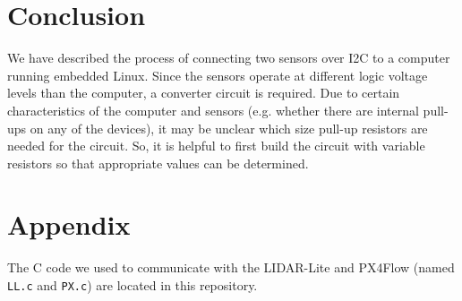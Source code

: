 \documentclass[10pt]{article}
\begin{document}
\section*{Conclusion}

We have described the process of connecting two sensors over I2C to a computer running embedded Linux. Since the sensors operate at different logic voltage levels than the computer, a converter circuit is required. Due to certain characteristics of the computer and sensors (e.g. whether there are internal pull-ups on any of the devices), it may be unclear which size pull-up resistors are needed for the circuit. So, it is helpful to first build the circuit with variable resistors so that appropriate values can be determined.


\section*{Appendix}

The C code we used to communicate with the LIDAR-Lite and PX4Flow (named \texttt{LL.c} and \texttt{PX.c}) are located in this repository.

\end{document}
